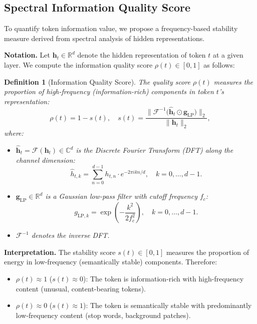 \documentclass[twocolumn]{article}
\newtheorem{definition}{Definition}
\begin{document}
\subsection{Spectral Information Quality Score}
\label{sec:quality-score}

To quantify token information value, we propose a frequency-based stability measure derived from spectral analysis of hidden representations.

\textbf{Notation.} Let $\mathbf{h}_t \in \mathbb{R}^d$ denote the hidden representation of token $t$ at a given layer. We compute the information quality score $\rho(t) \in [0, 1]$ as follows:

\begin{definition}[Information Quality Score]
The quality score $\rho(t)$ measures the proportion of high-frequency (information-rich) components in token $t$'s representation:
\begin{equation}
\rho(t) = 1 - s(t), \quad s(t) = \frac{\|\mathcal{F}^{-1}\bigl(\hat{\mathbf{h}}_t \odot \mathbf{g}_{\mathrm{LP}}\bigr)\|_2}{\|\mathbf{h}_t\|_2},
\label{eq:quality-score}
\end{equation}
where:
\begin{itemize}[leftmargin=*]
    \item $\hat{\mathbf{h}}_t = \mathcal{F}(\mathbf{h}_t) \in \mathbb{C}^d$ is the Discrete Fourier Transform (DFT) along the channel dimension:
    \begin{equation}
    \hat{h}_{t,k} = \sum_{n=0}^{d-1} h_{t,n} \cdot e^{-2\pi i k n / d}, \quad k = 0, \dots, d-1.
    \end{equation}
    \item $\mathbf{g}_{\mathrm{LP}} \in \mathbb{R}^d$ is a Gaussian low-pass filter with cutoff frequency $f_c$:
    \begin{equation}
    g_{\mathrm{LP},k} = \exp\left(-\frac{k^2}{2f_c^2}\right), \quad k = 0, \dots, d-1.
    \label{eq:gaussian-lpf}
    \end{equation}
    \item $\mathcal{F}^{-1}$ denotes the inverse DFT.
\end{itemize}
\end{definition}

\textbf{Interpretation.} The stability score $s(t) \in [0, 1]$ measures the proportion of energy in low-frequency (semantically stable) components. Therefore:
\begin{itemize}[leftmargin=*]
    \item $\rho(t) \approx 1$ ($s(t) \approx 0$): The token is information-rich with high-frequency content (unusual, content-bearing tokens).
    \item $\rho(t) \approx 0$ ($s(t) \approx 1$): The token is semantically stable with predominantly low-frequency content (stop words, background patches).
\end{itemize}
\end{document}
